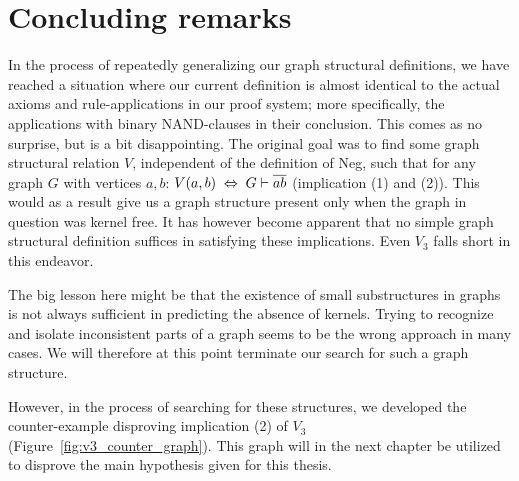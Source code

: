 \section{Concluding remarks}
\label{sec:Concluding remarks}
In the process of repeatedly generalizing our graph structural definitions, we have reached a situation where our current definition is almost identical to the actual axioms and rule-applications in our proof system; more specifically, the applications with binary NAND-clauses in their conclusion.
This comes as no surprise, but is a bit disappointing.
The original goal was to find some graph structural relation $V$, independent of the definition of Neg, such that for any graph $G$ with vertices $a,b$: $V(a,b) \; \Leftrightarrow \; G\vdash \ol{ab}$ (implication (1) and (2)).
This would as a result give us a graph structure present only when the graph in question was kernel free.
It has however become apparent that no simple graph structural definition suffices in satisfying these implications.
Even $V_3$ falls short in this endeavor.

The big lesson here might be that the existence of small substructures in graphs is not always sufficient in predicting the absence of kernels.
Trying to recognize and isolate inconsistent parts of a graph seems to be the wrong approach in many cases.
We will therefore at this point terminate our search for such a graph structure.

However, in the process of searching for these structures, we developed the counter-example disproving implication (2) of $V_3$ (Figure~\ref{fig:v3_counter_graph}).
This graph will in the next chapter be utilized to disprove the main hypothesis given for this thesis.
